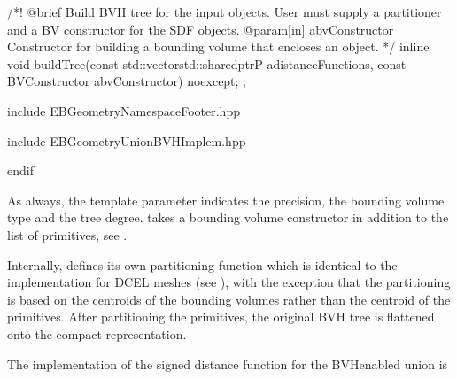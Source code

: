 \documentclass[letterpaper,10pt,english]{sphinxmanual}
\begin{document}
\begin{sphinxVerbatim}[commandchars=\\\{\}]
  /*!
    @brief Build BVH tree for the input objects. User must supply a partitioner
    and a BV constructor for the SDF objects.
    @param[in] a\PYGZus{}bvConstructor Constructor for building a bounding volume that
    encloses an object.
  */
  inline void
  buildTree(const std::vector\PYGZlt{}std::shared\PYGZus{}ptr\PYGZlt{}P\PYGZgt{}\PYGZgt{}\PYGZam{} a\PYGZus{}distanceFunctions, const BVConstructor\PYGZam{} a\PYGZus{}bvConstructor) noexcept;
\PYGZcb{};

\PYGZsh{}include \PYGZdq{}EBGeometry\PYGZus{}NamespaceFooter.hpp\PYGZdq{}

\PYGZsh{}include \PYGZdq{}EBGeometry\PYGZus{}UnionBVHImplem.hpp\PYGZdq{}

\PYGZsh{}endif
\end{sphinxVerbatim}

\sphinxAtStartPar
As always, the template parameter  indicates the precision,  the bounding volume type and  the tree degree.
 takes a bounding volume constructor in addition to the list of primitives, see {\hyperref[\detokenize{ImplemBVH:chap-bvhconstruction}]{}}.

\sphinxAtStartPar
Internally,  defines its own partitioning function which is identical to the implementation for DCEL meshes (see {\hyperref[\detokenize{ImplemDCEL:chap-bvhintegration}]{}}), with the exception that the partitioning is based on the centroids of the bounding volumes rather than the centroid of the primitives.
After partitioning the primitives, the original BVH tree is flattened onto the compact representation.

\sphinxAtStartPar
The implementation of the signed distance function for the BVH\sphinxhyphen{}enabled union is

\begin{sphinxVerbatim}[commandchars=\\\{\}]
\end{sphinxVerbatim}
\end{document}
